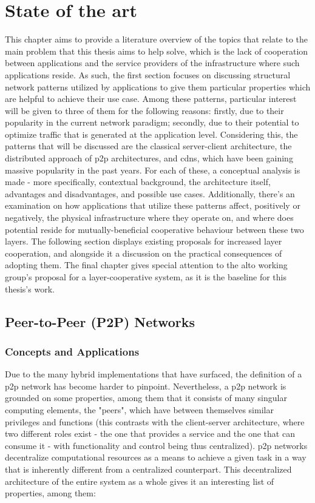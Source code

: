 \chapter{State of the art}


    This chapter aims to provide a literature overview of the topics that relate to the main problem that this thesis aims to help solve, which is the lack of cooperation between applications and the service providers of the infrastructure where such applications reside.
    As such, the first section focuses on discussing structural network patterns utilized by applications to give them particular properties which are helpful to achieve their use case.
    Among these patterns, particular interest will be given to three of them for the following reasons: firstly, due to their popularity in the current network paradigm; secondly, due to their potential to optimize traffic that is generated at the application level.
    Considering this, the patterns that will be discussed are the classical server-client architecture, the distributed approach of \gls{p2p} architectures, and \glspl{cdn}, which have been gaining massive popularity in the past years.
    For each of these, a conceptual analysis is made - more specifically, contextual background, the architecture itself, advantages and disadvantages, and possible use cases.
    Additionally, there's an examination on how applications that utilize these patterns affect, positively or negatively, the physical infrastructure where they operate on, and where does potential reside for mutually-beneficial cooperative behaviour between these two layers.
    The following section displays existing proposals for increased layer cooperation, and alongside it a discussion on the practical consequences of adopting them.
    The final chapter gives special attention to the \gls{alto} working group's proposal for a layer-cooperative system, as it is the baseline for this thesis's work.

\section{Peer-to-Peer (P2P) Networks}

\subsection{Concepts and Applications}

    Due to the many hybrid implementations that have surfaced, the definition of a \gls{p2p} network has become harder to pinpoint.
    Nevertheless, a \gls{p2p} network is grounded on some properties, among them that it consists of many singular computing elements, the "peers", which have between themselves similar privileges and functions (this contrasts with the client-server architecture, where two different roles exist - the one that provides a service and the one that can consume it - with functionality and control being thus centralized).
    \gls{p2p} networks decentralize computational resources as a means to achieve a given task in a way that is inherently different from a centralized counterpart.
    This decentralized architecture of the entire system as a whole gives it an interesting list of properties, among them:

